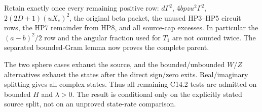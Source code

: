 Retain exactly once every remaining positive row: $d\Gamma^2$,
$4bpzu^2\Gamma^2$, $2(2D+1)(uX_e)^2$, the original beta packet,
the unused HP3--HP5 circuit rows, the HP7 remainder from HP8, and
all source-cap excesses.  In particular the $(a-b)^2/2$ row and
the angular fraction used for $T_1$ are not counted twice.
The separated bounded-Gram lemma now proves the complete parent.

The two sphere cases exhaust the source, and the bounded/unbounded
$W/Z$ alternatives exhaust the states after the direct sign/zero
exits.  Real/imaginary splitting gives all complex states.  Thus all
remaining C14.2 tests are admitted on bounded $H$ and $\lambda>0$.
The result is conditional only on the explicitly stated source split,
not on an unproved state-rate comparison.
